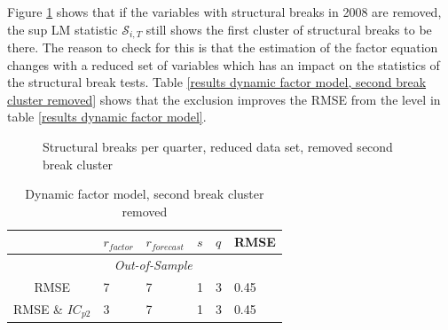 \documentclass[11pt]{article}
\begin{document}
Figure \ref{breaks per period, reduced data set, removed second breaks} shows that if the variables with structural breaks in 2008 are removed, the sup LM statistic $\mathscr{S}_{i,T}$ still shows the first cluster of structural breaks to be there. The reason to check for this is that the estimation of the factor equation changes with a reduced set of variables which has an impact on the statistics of the structural break tests.
Table \ref{results dynamic factor model, second break cluster removed} shows that the exclusion improves the RMSE from the level in table \ref{results dynamic factor model}.

\begin{figure}[htp]
	\centering
	\caption{Structural breaks per quarter, reduced data set, removed second break cluster}
	\label{breaks per period, reduced data set, removed second breaks}
\end{figure}


\begin{table}[ht]
	\caption{Dynamic factor model, second break cluster removed}
	\label{results dynamic factor model, first break cluster removed}
	\centering
	\begin{tabular}{c|lllll}
		  & $r_{factor}$ & $r_{forecast}$ & $s$ & $q$ & RMSE\\
		 \hline
		 \hline

		  & \multicolumn{3}{c}{\textit{Out-of-Sample}} \\ 
		   	RMSE & 7 & 7 & 1 & 3 & 0.45 \\
		   	RMSE \& $IC_{p2}$ & 3 & 7 & 1 & 3 & 0.45 \\
		  \hline
	\end{tabular}
\end{table}
\end{document}
